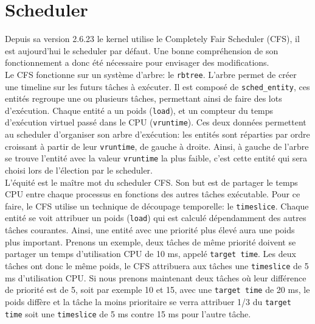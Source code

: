 \section*{Scheduler}

Depuis sa version 2.6.23 le kernel utilise le Completely Fair Scheduler (CFS), il est aujourd'hui le scheduler par défaut. Une bonne compréhension de son fonctionnement a donc été nécessaire pour envisager des modifications.
\\

Le CFS fonctionne sur un système d'arbre: le \verb|rbtree|. L'arbre permet de créer une timeline sur les futurs tâches à exécuter. 
Il est composé de \verb|sched_entity|, ces entités regroupe une ou plusieurs tâches, permettant ainsi de faire des lots d'exécution. Chaque entité a un poids (\verb|load|), et un compteur du temps d'exécution virtuel passé dans le CPU (\verb|vruntime|). Ces deux données permettent au scheduler d'organiser son arbre d'exécution: les entités sont réparties par ordre croissant à partir de leur \verb|vruntime|, de gauche à droite. Ainsi, à gauche de l'arbre se trouve l'entité avec la valeur \verb|vruntime| la plus faible, c'est cette entité qui sera choisi lors de l'élection par le scheduler.
\\

L'équité est le maître mot du scheduler CFS. Son but est de partager le temps CPU entre chaque processus en fonctions des autres tâches exécutable. Pour ce faire, le CFS utilise un technique de découpage temporelle: le \verb|timeslice|. Chaque entité se voit attribuer un poids (\verb|load|) qui est calculé dépendamment des autres tâches courantes. Ainsi, une entité avec une priorité plus élevé aura une poids plus important. Prenons un exemple, deux tâches de même priorité doivent se partager un temps d'utilisation CPU de 10 ms, appelé \verb|target time|. Les deux tâches ont donc le même poids, le CFS attribuera aux tâches une \verb|timeslice| de 5 ms d'utilisation CPU. Si nous prenons maintenant deux tâches où leur différence de priorité est de 5, soit par exemple 10 et 15, avec une \verb|target time| de 20 ms, le poids diffère et la tâche la moins prioritaire se verra attribuer 1/3 du \verb|target time| soit une \verb|timeslice| de 5 ms contre 15 ms pour l'autre tâche.
\\

